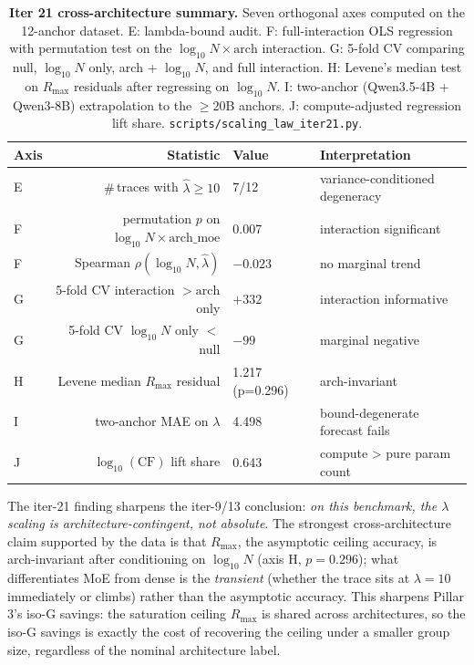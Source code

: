 \begin{table}[t]
  \centering
  \small
  \begin{tabular}{lrll}
    \toprule
    Axis & Statistic & Value & Interpretation \\
    \midrule
    E & $\#$\,traces with $\hat\lambda \ge 10$ & 7/12 & variance-conditioned degeneracy \\
    F & permutation $p$ on $\log_{10}N\!\times\!\mathrm{arch\_moe}$ & 0.007 & interaction significant \\
    F & Spearman $\rho(\log_{10}N,\hat\lambda)$ & $-0.023$ & no marginal trend \\
    G & 5-fold CV interaction $>\!\mathrm{arch}$ only & $+332$ & interaction informative \\
    G & 5-fold CV $\log_{10}N$ only $<$ null & $-99$ & marginal negative \\
    H & Levene median $R_{\max}$ residual & 1.217 (p=0.296) & arch-invariant \\
    I & two-anchor MAE on $\lambda$ & 4.498 & bound-degenerate forecast fails \\
    J & $\log_{10}(\mathrm{CF})$ lift share & 0.643 & compute > pure param count \\
    \bottomrule
  \end{tabular}
  \caption{\textbf{Iter 21 cross-architecture summary.}
    Seven orthogonal axes computed on the 12-anchor dataset.
    E: lambda-bound audit.  F: full-interaction OLS regression with
    permutation test on the $\log_{10}N\!\times\!\mathrm{arch}$
    interaction.  G: 5-fold CV comparing null, $\log_{10}N$ only,
    arch + $\log_{10}N$, and full interaction.  H: Levene's median test
    on $R_{\max}$ residuals after regressing on $\log_{10}N$.
    I: two-anchor (Qwen3.5-4B + Qwen3-8B) extrapolation to the
    $\ge 20$B anchors.  J: compute-adjusted regression lift share.
    \texttt{scripts/scaling\_law\_iter21.py}.}
  \label{tab:scaling-iter21-summary}
\end{table}

The iter-21 finding sharpens the iter-9/13 conclusion:
\emph{on this benchmark, the $\lambda$ scaling is
architecture-contingent, not absolute}.  The strongest
cross-architecture claim supported by the data is that
$R_{\max}$, the asymptotic ceiling accuracy, is
arch-invariant after conditioning on $\log_{10}N$ (axis H,
$p = 0.296$); what differentiates MoE from dense is the
\emph{transient} (whether the trace sits at $\lambda=10$
immediately or climbs) rather than the asymptotic accuracy.
This sharpens Pillar 3's iso-G savings: the saturation
ceiling $R_{\max}$ is shared across architectures, so the
iso-G savings is exactly the cost of recovering the
ceiling under a smaller group size, regardless of the
nominal architecture label.

